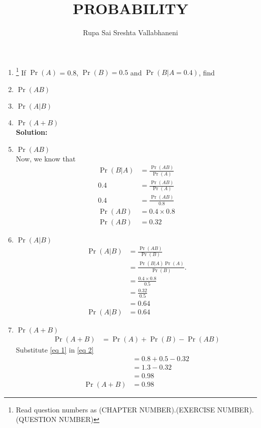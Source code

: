 \documentclass{article}
\newcommand{\solution}{\noindent \textbf{Solution: }}
\providecommand{\pr}[1]{\ensuremath{\Pr\left(#1\right)}}
\begin{document}
\title{PROBABILITY}
\author{\Large Rupa Sai Sreshta Vallabhaneni}
\date{}

\maketitle
\begin{enumerate}[label=13.\arabic{enumi}.\arabic{enumii}]%
\setcounter{enumi}{0}
\setcounter{enumii}{3}

\item \footnote{Read question numbers as (CHAPTER NUMBER).(EXERCISE NUMBER).(QUESTION NUMBER)}  If $\pr{A}$ = 0.8, $\pr{B} = 0.5$ and $\pr{B \vert A = 0.4}$, find  
\item
$\pr{AB}$ 
\item
 $\pr{A \vert B}$
\item
 $\pr{A+B}$
\\[1ex]

\solution
\item $\pr{AB}$
 \\
  Now, we know that
 \begin{align}
\pr{B \vert A} &= \frac{\pr{AB}}{\pr{A}}
 \\
 0.4 &= \frac{\pr{AB}}{\pr{A}}
 \\
 0.4 &= \frac{\pr{AB}}{0.8}
 \\
 \pr{AB} &= 0.4 \times 0.8
 \\
 \pr{AB} &= 0.32
 \label{eq 1}
 \end{align}
 \item
 $\pr{A \vert B}$
 \begin{align}
 \pr{A \vert B} &= \frac{\pr{AB}}{\pr{B}}
 \\
 &= \frac{\pr{ B \vert A}\pr{A}}{\pr{B}}.
 \\
  &= \frac{0.4 \times 0.8}{0.5}
 \\
 &= \frac{0.32}{0.5}
 \\
 &= 0.64
 \\
\pr{A \vert B} &= 0.64
 \end{align}
 \item
  $\pr{A+B}$
 \begin{align}
 \pr{A+B} &= \pr{A}+\pr{B}-\pr{AB} 
 \label{eq 2}
 \end{align}
 Substitute \eqref{eq 1}  in \eqref{eq 2}
 \begin{align}
 &=0.8+0.5-0.32
 \\
 &=1.3-0.32
 \\
 &= 0.98
 \\
 \pr{A+B} &= 0.98
 \end{align}
\end{enumerate}
\end{document}
